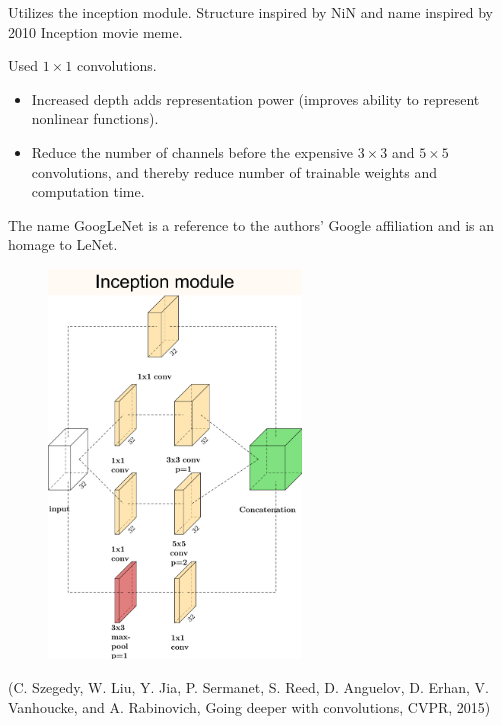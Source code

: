 \documentclass{report}
\begin{document}
\begin{definition}
    Utilizes the inception module. Structure inspired by NiN and name inspired by 2010 Inception movie meme.

    Used $1 \times 1$ convolutions.

    \begin{itemize}
        \item Increased depth adds representation power (improves ability to represent nonlinear functions).
        \item Reduce the number of channels before the expensive $3 \times 3$ and $5 \times 5$ convolutions, and thereby reduce number of trainable weights and computation time.
    \end{itemize}

    The name GoogLeNet is a reference to the authors' Google affiliation and is an homage to LeNet.

    \begin{figure}[H]
        \centering
        \includegraphics[width=0.6\textwidth]{.././assets/7.12.png}
    \end{figure}

    (C. Szegedy, W. Liu, Y. Jia, P. Sermanet, S. Reed, D. Anguelov, D. Erhan, V. Vanhoucke, and A. Rabinovich, Going deeper with convolutions, CVPR, 2015)

    \par\noindent\textcolor{gray}{\hdashrule{\textwidth}{0.4pt}{1pt 2pt}}


\end{definition}
\end{document}
